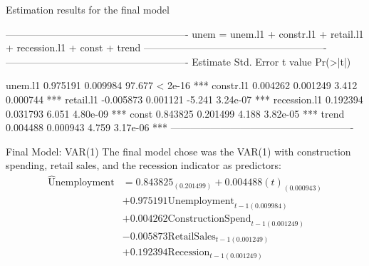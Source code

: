 \documentclass[ignorenonframetext]{beamer}
\begin{document}
    \begin{frame}[fragile]{Estimation results for the final model}
\begin{verbnobox}[\small]
-------------------------------------------------------
unem = unem.l1 + constr.l1 + retail.l1 + recession.l1 
		+ const + trend 
-------------------------------------------------------
-------------------------------------------------------
          Estimate Std. Error t value Pr(>|t|)    

unem.l1       0.975191   0.009984  97.677  < 2e-16 ***
constr.l1     0.004262   0.001249   3.412 0.000744 ***
retail.l1    -0.005873   0.001121  -5.241 3.24e-07 ***
recession.l1  0.192394   0.031793   6.051 4.80e-09 ***
const         0.843825   0.201499   4.188 3.82e-05 ***
trend         0.004488   0.000943   4.759 3.17e-06 ***
-------------------------------------------------------
\end{verbnobox}
\end{frame}
 
 
 
  	\begin{frame}{Final Model: VAR(1)}
  		 The final model chose was the VAR(1) with construction spending, retail sales, and the recession indicator as predictors:
  \begin{align*}
  \widehat{\text{U}}\text{nemployment} &= 0.843825_{(0.201499)} +
  0.004488(t)_{(0.000943)}\\ 		
  &+ 0.975191\text{Unemployment}_{t-1 (0.009984)}\\
  &+ 0.004262\text{ConstructionSpend}_{t-1(0.001249)}\\
  &- 0.005873\text{RetailSales}_{t-1(0.001249)}\\
  &+ 0.192394\text{Recession}_{t-1(0.001249)}
  \end{align*}
  	\end{frame}
\end{document}
